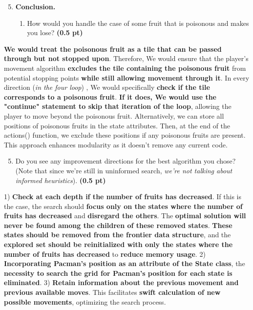 \documentclass[11pt,a4paper]{report}
\begin{document}
\begin{enumerate}
\setcounter{enumi}{4}
\item \textbf{Conclusion.}
\begin{enumerate}
        \item How would you handle the case of some fruit that is poisonous and makes
you lose?
\textbf{(0.5 pt)}
\end{enumerate}

\end{enumerate}

\begin{answer}
{\footnotesize \textbf{We would treat the poisonous fruit as a tile that can be passed through but not stopped upon}. Therefore, We would ensure that the player's movement algorithm \textbf{excludes the tile containing the poisonous fruit} from potential stopping points \textbf{while still allowing movement through it}. In every direction (\textit{in the four loop}) , We would specifically \textbf{check if the tile corresponds to a poisonous fruit}. \textbf{If it does, We would use the "continue" statement to skip that iteration of the loop}, allowing the player to move beyond the poisonous fruit. Alternatively, we can store all positions of poisonous fruits in the state attributes. Then, at the end of the actions() function, we exclude these positions if any poisonous fruits are present. This approach enhances modularity as it doesn't remove any current code.}
\end{answer}

\begin{enumerate}
\setcounter{enumi}{4}
\begin{enumerate}
\setcounter{enumii}{4}
        \item  Do you see any improvement directions for the best algorithm you chose? (Note that since we're still in uninformed search, \textit{we're not talking about informed heuristics}). \textbf{(0.5 pt)}
\end{enumerate}

\end{enumerate}

\begin{answer}
{\footnotesize 1) \textbf{Check at each depth if the number of fruits has decreased}. If this is the case, the search should \textbf{focus only on the states where the number of fruits has decreased} and \textbf{disregard the others}. The \textbf{optimal solution will never be found among the children of these removed states}. \textbf{These states should be removed from the frontier data structure}, and the \textbf{explored set should be reinitialized with only the states where the number of fruits has decreased} to \textbf{reduce memory usage}.
2) \textbf{Incorporating Pacman's position as an attribute of the State class}, the \textbf{necessity to search the grid for Pacman's position for each state is eliminated}.
3) \textbf{Retain information about the previous movement and previous available moves}. This facilitates \textbf{swift calculation of new possible movements}, optimizing the search process.}
\end{answer}
\end{document}
